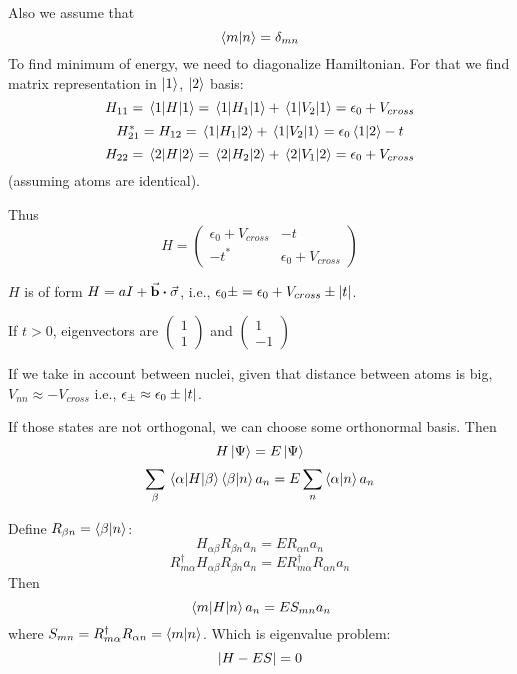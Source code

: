 Also we assume that
$$\braket{m}{n} = \delta_{mn}$$
To find minimum of energy, we need to diagonalize Hamiltonian.  For that we find matrix representation in $\ket{1}$, $\ket{2}$ basis:
$$H_{11} = \mel{1}{H}{1}  = \mel{1}{H_1}{1} + \mel{1}{V_2}{1} = \epsilon_0 + V_{cross}$$
$$H_{21}^* = H_{12} = \mel{1}{H_1}{2} + \mel{1}{V_2}{1} = \epsilon_0 \braket{1}{2}  - t$$
$$H_{22} = \mel{2}{H}{2} = \mel{2}{H_2}{2} + \mel{2}{V_1}{2} = \epsilon_0 + V_{cross}$$
(assuming atoms are identical).

Thus
$$H  =\begin{pmatrix}
\epsilon_0 + V_{cross}  & -t\\
-t^* & \epsilon_0 + V_{cross}
\end{pmatrix}$$

$H$ is of form $H=aI + \va{b} \vdot \va{\sigma}$, i.e., $\epsilon_0\pm = \epsilon_0 + V_{cross} \pm \abs{t}$.

If $t>0$, eigenvectors are $\begin{pmatrix}1\\1\end{pmatrix}$ and $\begin{pmatrix}1\\-1\end{pmatrix}$

If we take in account between nuclei, given that distance between atoms is big, $V_{nn} \approx - V_{cross}$ i.e., $\epsilon_\pm \approx \epsilon_0 \pm \abs{t}$.

If those states are not orthogonal, we can choose some orthonormal basis. Then
$$H\ket{\Psi} = E\ket{\Psi}$$ 
$$\sum_{\beta} \mel{\alpha}{H}{\beta} \braket{\beta}{n}a_n = E \sum_n \braket{\alpha}{n}a_n$$

Define $R_{\beta n} = \braket{\beta}{n}$:
$$H_{\alpha \beta} R_{\beta n}a_n = ER_{\alpha n } a_n$$
$$R^\dagger_{m \alpha} H_{\alpha \beta} R_{\beta n}a_n = ER^\dagger_{m \alpha}R_{\alpha n } a_n$$
Then
$$\mel{m}{H}{n} a_n = ES_{mn} a_n$$
where $S_{mn} = R^\dagger_{m \alpha}R_{\alpha n } = \braket{m}{n}$.
Which is eigenvalue problem:
$$\abs{H-ES} = 0$$